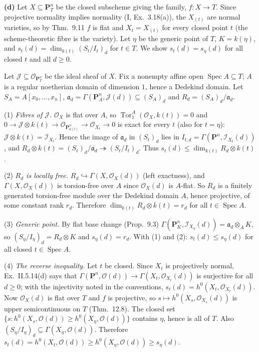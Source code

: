\documentclass[11pt]{article}
\begin{document}
\textbf{(d)} Let $X\subseteq\mathbf P^n_T$ be the closed subscheme giving the family, $f:X\to T$. Since projective normality implies normality (I, Ex.~3.18(a)), the $X_{(t)}$ are normal varieties, so by Thm.~9.11 $f$ is flat and $X_t=X_{(t)}$ for every closed point $t$ (the scheme-theoretic fibre is the variety). Let $\eta$ be the generic point of $T$, $K=k(\eta)$, and $s_t(d)=\dim_{k(t)}(S_t/I_t)_d$ for $t\in T$. We show $s_t(d)=s_\eta(d)$ for all closed $t$ and all $d\ge0$.

Let $\mathcal J\subseteq\mathcal O_{\mathbf P^n_T}$ be the ideal sheaf of $X$. Fix a nonempty affine open $\operatorname{Spec}A\subseteq T$; $A$ is a regular noetherian domain of dimension $1$, hence a Dedekind domain. Let $S_A=A[x_0,\dots,x_n]$, $\mathfrak a_d=\Gamma(\mathbf P^n_A,\mathcal J(d))\subseteq(S_A)_d$ and $R_d=(S_A)_d/\mathfrak a_d$.

(1) \emph{Fibres of $\mathcal J$.} $\mathcal O_X$ is flat over $A$, so $\operatorname{Tor}_1^A(\mathcal O_X,k(t))=0$ and $0\to\mathcal J\otimes k(t)\to\mathcal O_{\mathbf P^n_{k(t)}}\to\mathcal O_{X_t}\to0$ is exact for every $t$ (also for $t=\eta$): $\mathcal J\otimes k(t)=\mathcal I_{X_t}$. Hence the image of $\mathfrak a_d$ in $(S_t)_d$ lies in $I_{t,d}=\Gamma(\mathbf P^n,\mathcal I_{X_t}(d))$, and $R_d\otimes k(t)=(S_t)_d/\overline{\mathfrak a_d}\twoheadrightarrow(S_t/I_t)_d$. Thus $s_t(d)\le\dim_{k(t)}R_d\otimes k(t)$.

(2) \emph{$R_d$ is locally free.} $R_d\hookrightarrow\Gamma(X,\mathcal O_X(d))$ (left exactness), and $\Gamma(X,\mathcal O_X(d))$ is torsion-free over $A$ since $\mathcal O_X(d)$ is $A$-flat. So $R_d$ is a finitely generated torsion-free module over the Dedekind domain $A$, hence projective, of some constant rank $r_d$. Therefore $\dim_{k(t)}R_d\otimes k(t)=r_d$ for all $t\in\operatorname{Spec}A$.

(3) \emph{Generic point.} By flat base change (Prop.~9.3) $\Gamma(\mathbf P^n_K,\mathcal I_{X_\eta}(d))=\mathfrak a_d\otimes_AK$, so $(S_\eta/I_\eta)_d=R_d\otimes K$ and $s_\eta(d)=r_d$. With (1) and (2): $s_t(d)\le s_\eta(d)$ for all closed $t\in\operatorname{Spec}A$.

(4) \emph{The reverse inequality.} Let $t$ be closed. Since $X_t$ is projectively normal, Ex.~II.5.14(d) says that $\Gamma(\mathbf P^n,\mathcal O(d))\to\Gamma(X_t,\mathcal O_{X_t}(d))$ is surjective for all $d\ge0$; with the injectivity noted in the conventions, $s_t(d)=h^0(X_t,\mathcal O_{X_t}(d))$. Now $\mathcal O_X(d)$ is flat over $T$ and $f$ is projective, so $s\mapsto h^0(X_s,\mathcal O_{X_s}(d))$ is upper semicontinuous on $T$ (Thm.~12.8). The closed set $\{s:h^0(X_s,\mathcal O(d))\ge h^0(X_\eta,\mathcal O(d))\}$ contains $\eta$, hence is all of $T$. Also $(S_\eta/I_\eta)_d\subseteq\Gamma(X_\eta,\mathcal O(d))$. Therefore $s_t(d)=h^0(X_t,\mathcal O(d))\ge h^0(X_\eta,\mathcal O(d))\ge s_\eta(d)$.
\end{document}

